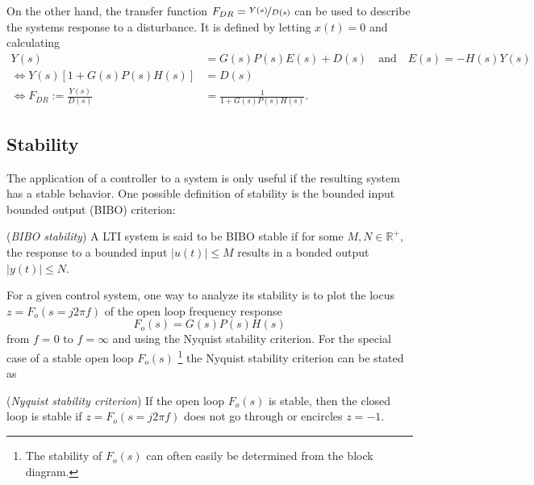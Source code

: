 On the other hand, the transfer function $F_{DR}=\nicefrac{Y(s)}{D(s)}$ can be used to describe the systems response to a disturbance.\cite[p.~88]{Foellinger2016} It is defined by letting $x(t)=0$ and calculating
\begin{align}
Y(s)&=G(s)P(s)E(s)+D(s)\quad\text{and}\quad E(s)=-H(s)Y(s)\\
\Leftrightarrow Y(s)\left[1+G(s)P(s)H(s)\right]&=D(s)\\
\Leftrightarrow F_{DR}:=\frac{Y(s)}{D(s)}&=\frac{1}{1+G(s)P(s)H(s)}.
\end{align}

\subsection{Stability}
The application of a controller to a system is only useful if the resulting system has a stable behavior.
One possible definition of stability is the bounded input bounded output (BIBO) criterion\cite[p.~82]{Foellinger2016}:
\begin{definition}
(\textit{BIBO stability}) A LTI system is said to be BIBO stable if for some $M,N \in \mathbb{R}^+$, the response to a bounded input $|u(t)| \le M$ results in a bonded output $|y(t)| \le N$.
\end{definition}

For a given control system, one way to analyze its stability is to plot the locus $z=F_o(s=j2\pi f)$ of the open loop frequency response
\begin{equation}
F_o(s) = G(s)P(s)H(s)
\end{equation}
from $f=0$ to $f=\infty$ and using the Nyquist stability criterion.
For the special case of a stable open loop $F_o(s)$ \footnote{The stability of $F_o(s)$ can often easily be determined from the block diagram.} the Nyquist stability criterion can be stated as\cite[p.~111]{Foellinger2016}
\begin{definition}
(\textit{Nyquist stability criterion}) If the open loop $F_o(s)$ is stable, then the closed loop is stable if $z=F_o(s=j2\pi f)$ does not go through or encircles $z=-1$.
\end{definition}

